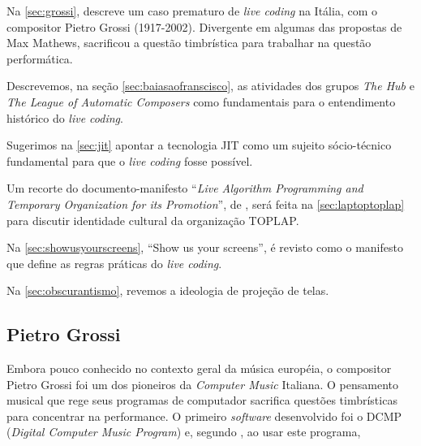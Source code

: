 Na \autoref{sec:grossi},   descreve um caso prematuro de \emph{live coding} na Itália, com o compositor Pietro Grossi (1917-2002). Divergente em algumas das propostas de Max Mathews, sacrificou a questão timbrística para trabalhar na questão performática.

Descrevemos, na seção \autoref{sec:baiasaofranscisco}, as atividades dos grupos \emph{The Hub} e \emph{The League of Automatic Composers} como fundamentais para o entendimento histórico do \emph{live coding}.

Sugerimos na \autoref{sec:jit} apontar a tecnologia JIT \cite{aycock_brief_2003} como um sujeito sócio-técnico fundamental para que o \emph{live coding} fosse possível.

Um recorte do documento-manifesto ``\emph{Live Algorithm Programming and Temporary Organization for its Promotion}'', de , será feita na \autoref{sec:laptoptoplap} para discutir identidade cultural da organização TOPLAP. 

Na \autoref{sec:showusyourscreens}, ``Show us your screens'', é revisto como o manifesto que define as regras práticas do \emph{live coding}.

Na \autoref{sec:obscurantismo}, revemos a ideologia de projeção de telas.


\subsection{Pietro Grossi}\label{sec:grossi}

Embora pouco conhecido no contexto geral da música européia, o compositor Pietro Grossi foi  um dos pioneiros da \emph{Computer Music} Italiana. O pensamento musical que rege seus programas de computador sacrifica questões timbrísticas para concentrar na performance. O primeiro \emph{software} desenvolvido foi o DCMP (\emph{Digital Computer Music Program}) e, segundo , ao usar este programa,

